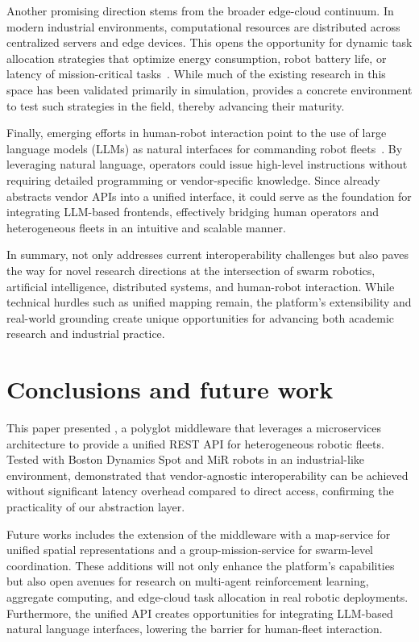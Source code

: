 \documentclass[conference]{IEEEtran}
\begin{document}
Another promising direction stems from the broader edge-cloud continuum. 
%
In modern industrial environments, 
 computational resources are distributed across centralized servers and edge devices. 
% 
This opens the opportunity for dynamic task allocation strategies that optimize 
 energy consumption, robot battery life, or latency 
 of mission-critical tasks~\cite{domini2024woa}. 
% 
While much of the existing research in this space has been validated primarily in simulation, 
 \approach{} provides a concrete environment to test such strategies in the field, 
 thereby advancing their maturity.

Finally, emerging efforts in human-robot interaction point to the use of large language models (LLMs) 
 as natural interfaces for commanding robot fleets~\cite{olaiya2025natural,aguzzi2025language}. 
% 
By leveraging natural language, operators could issue high-level instructions without requiring 
 detailed programming or vendor-specific knowledge. 
% 
Since \approach{} already abstracts vendor APIs into a unified interface, 
 it could serve as the foundation for integrating LLM-based frontends, 
 effectively bridging human operators and heterogeneous fleets in an intuitive and scalable manner.

In summary, \approach{} not only addresses current interoperability challenges 
 but also paves the way for novel research directions at the intersection of 
 swarm robotics, artificial intelligence, distributed systems, and human-robot interaction. 
% 
While technical hurdles such as unified mapping remain, 
 the platform's extensibility and real-world grounding create unique opportunities 
 for advancing both academic research and industrial practice.


\section{Conclusions and future work}\label{sec:future}

This paper presented \approach{}, 
 a polyglot middleware that leverages a microservices architecture to provide a unified REST API 
 for heterogeneous robotic fleets. 
% 
Tested with Boston Dynamics Spot and MiR robots in an industrial-like environment, 
 \approach{} demonstrated that vendor-agnostic interoperability can be achieved 
 without significant latency overhead compared to direct access, 
 confirming the practicality of our abstraction layer.

Future works includes the extension of the middleware with a map-service 
 for unified spatial representations and a group-mission-service for swarm-level coordination. 
% 
These additions will not only enhance the platform's capabilities 
 but also open avenues for research on multi-agent reinforcement learning, aggregate computing, 
 and edge-cloud task allocation in real robotic deployments. 
% 
Furthermore, the unified API creates opportunities for integrating LLM-based natural language interfaces, 
 lowering the barrier for human-fleet interaction.
\end{document}
